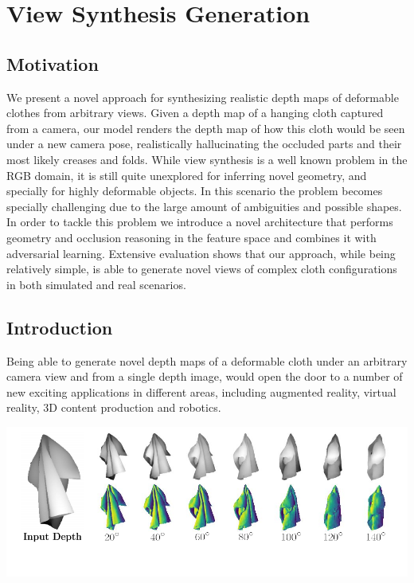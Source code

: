 \chapter{View Synthesis Generation}
\label{chap:chap_05}
\vspace{-8mm}

\section{Motivation}

We present a novel approach for synthesizing realistic depth maps of deformable clothes from arbitrary views. Given a depth map of a hanging cloth captured from a camera, our model renders the depth map of how this cloth would be seen under a new camera pose, realistically hallucinating the occluded parts and their most likely creases and folds. While view synthesis is a well known problem in the RGB domain, it is still quite unexplored for inferring novel geometry, and specially for highly deformable objects. In this scenario the   problem becomes specially challenging due to the large amount of ambiguities and possible shapes. In order to tackle this  problem we introduce a novel architecture that performs geometry and occlusion reasoning in the feature space and combines it with adversarial learning.   Extensive evaluation shows that our approach, while being relatively simple, is able to generate novel views of complex cloth configurations in both simulated and real scenarios. 

\section{Introduction}

Being able to generate novel depth maps of a deformable cloth under an arbitrary camera view and from a single depth image,   would open the door to a number of new exciting applications in different areas, including augmented reality, virtual reality, 3D content production and robotics.

\begin{center}
    \centering
    \includegraphics[width=\linewidth]{main/chapter04/data/ipalm_cvpr_image_teaser.pdf}
    \label{fig:teaser}
\end{center}

